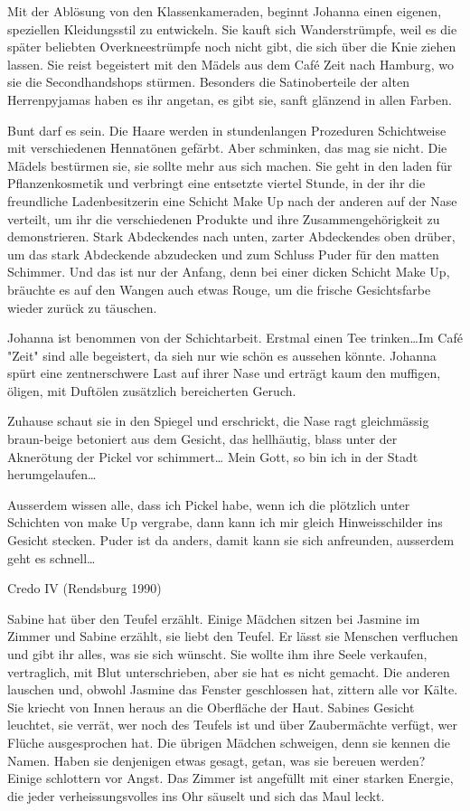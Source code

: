 \documentclass[10pt,a5paper]{book}
\begin{document}
Mit der Ablösung von den Klassenkameraden, beginnt Johanna einen eigenen, speziellen Kleidungsstil zu entwickeln. Sie kauft sich Wanderstrümpfe, weil es die später beliebten Overkneestrümpfe noch nicht gibt, die sich über die Knie ziehen lassen. Sie reist begeistert mit den Mädels aus dem Café Zeit nach Hamburg, wo sie die Secondhandshops stürmen. Besonders die Satinoberteile der alten Herrenpyjamas haben es ihr angetan, es gibt sie, sanft glänzend in allen Farben. 

Bunt darf es sein. Die Haare werden in stundenlangen Prozeduren Schichtweise mit verschiedenen Hennatönen gefärbt. Aber schminken, das mag sie nicht. Die Mädels bestürmen sie, sie sollte mehr aus sich machen. Sie geht in den laden für Pflanzenkosmetik und verbringt eine entsetzte viertel Stunde, in der ihr die freundliche Ladenbesitzerin eine Schicht Make Up nach der anderen auf der Nase verteilt, um ihr die verschiedenen Produkte und ihre Zusammengehörigkeit zu demonstrieren. Stark Abdeckendes nach unten, zarter Abdeckendes oben drüber, um das stark Abdeckende abzudecken und zum Schluss Puder für den matten Schimmer. Und das ist nur der Anfang, denn bei einer dicken Schicht Make Up, bräuchte es auf den Wangen auch etwas Rouge, um die frische Gesichtsfarbe wieder zurück zu täuschen. 

Johanna ist benommen von der Schichtarbeit. Erstmal einen Tee trinken\dots  Im Café "Zeit" sind alle begeistert, da sieh nur wie schön es aussehen könnte. Johanna spürt eine zentnerschwere Last auf ihrer Nase und erträgt kaum den muffigen, öligen, mit Duftölen zusätzlich bereicherten Geruch.

Zuhause schaut sie in den Spiegel und erschrickt, die Nase ragt gleichmässig braun-beige betoniert aus dem Gesicht, das hell\-häutig, blass unter der Aknerötung der Pickel vor schimmert\dots{} Mein Gott, so bin ich in der Stadt herumgelaufen\dots 

Ausserdem wissen alle, dass ich Pickel habe, wenn ich die plötzlich unter Schichten von make Up vergrabe, dann kann ich mir gleich Hinweisschilder ins Gesicht stecken. Puder ist da anders, damit kann sie sich anfreunden, ausserdem geht es schnell\dots 



Credo IV (Rendsburg 1990)



Sabine hat über den Teufel erzählt. Einige Mädchen sitzen bei Jasmine im Zimmer und Sabine erzählt, sie liebt den Teufel. Er lässt sie Menschen verfluchen und gibt ihr alles, was sie sich wünscht. Sie wollte ihm ihre Seele verkaufen, vertraglich, mit Blut unterschrieben, aber sie hat es nicht gemacht. Die anderen lauschen und, obwohl Jasmine das Fenster geschlossen hat, zittern alle vor Kälte. Sie kriecht von Innen heraus an die Oberfläche der Haut. Sabines Gesicht leuchtet, sie verrät, wer noch des Teufels ist und über Zaubermächte verfügt, wer Flüche ausgesprochen hat. Die übrigen Mädchen schweigen, denn sie kennen die Namen. Haben sie denjenigen etwas gesagt, getan,  was sie bereuen werden? Einige schlottern vor Angst. Das Zimmer ist angefüllt mit einer starken Energie, die jeder verheissungsvolles ins Ohr säuselt und sich das Maul leckt.
\end{document}
